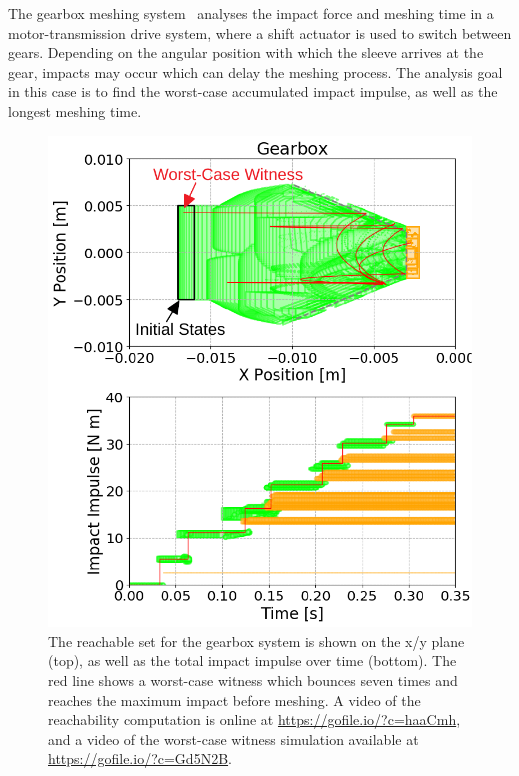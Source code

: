 The gearbox meshing system~\cite{chen2014motor} analyses the impact force and meshing time in a motor-transmission drive system,
where a shift actuator is used to switch between gears.
%
Depending on the angular position with which the sleeve arrives at the gear, impacts may occur which can delay the meshing process.
%
The analysis goal in this case is to find the worst-case accumulated impact impulse, as well as the longest meshing time.


\begin{figure}[t]
\centerline{\includegraphics[width=0.8\columnwidth]{images/gearbox_annotated}}
\caption{The reachable set for the gearbox system is shown on the x/y plane (top), as well as the total impact impulse over time (bottom).
%
The red line shows a worst-case witness which bounces seven times and reaches the maximum impact before meshing.
%
A video of the reachability computation is online at \url{https://gofile.io/?c=haaCmh}, and a video of the worst-case witness
simulation available at \url{https://gofile.io/?c=Gd5N2B}.}
\label{fig:gearbox_reach}
\end{figure}

